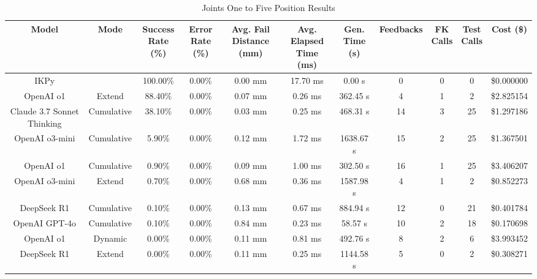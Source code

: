 \begin{table}[H]
\tiny
\renewcommand{\arraystretch}{1.2}
\caption{Joints One to Five Position Results}
\begin{center}
\begin{tabular}{|c|c|c|c|c|c|c|c|c|c|c|}
    \hline
    \textbf{Model} & 
    \textbf{Mode} & 
    \makecell{\textbf{Success}\\\textbf{Rate (\%)}} &
    \makecell{\textbf{Error}\\\textbf{Rate (\%)}} &
    \makecell{\textbf{Avg. Fail}\\\textbf{Distance (mm)}} &
    \makecell{\textbf{Avg. Elapsed}\\\textbf{Time (ms)}} &
    \makecell{\textbf{Gen.}\\\textbf{Time (s)}} &
    \textbf{Feedbacks} &
    \makecell{\textbf{FK}\\\textbf{Calls}} &
    \makecell{\textbf{Test}\\\textbf{Calls}} &
    \textbf{Cost (\$)} \\
    \hline
    IKPy &  & 100.00\% & 0.00\% & 0.00 mm & 17.70 ms & 0.00 s & 0 & 0 & 0 & \$0.000000 \\
    \hline
    OpenAI o1 & Extend & 88.40\% & 0.00\% & 0.07 mm & 0.26 ms & 362.45 s & 4 & 1 & 2 & \$2.825154 \\
    \hline
    Claude 3.7 Sonnet Thinking & Cumulative & 38.10\% & 0.00\% & 0.03 mm & 0.25 ms & 468.31 s & 14 & 3 & 25 & \$1.297186 \\
    \hline
    OpenAI o3-mini & Cumulative & 5.90\% & 0.00\% & 0.12 mm & 1.72 ms & 1638.67 s & 15 & 2 & 25 & \$1.367501 \\
    \hline
    OpenAI o1 & Cumulative & 0.90\% & 0.00\% & 0.09 mm & 1.00 ms & 302.50 s & 16 & 1 & 25 & \$3.406207 \\
    \hline
    OpenAI o3-mini & Extend & 0.70\% & 0.00\% & 0.68 mm & 0.36 ms & 1587.98 s & 4 & 1 & 2 & \$0.852273 \\
    \hline
    DeepSeek R1 & Cumulative & 0.10\% & 0.00\% & 0.13 mm & 0.67 ms & 884.94 s & 12 & 0 & 21 & \$0.401784 \\
    \hline
    OpenAI GPT-4o & Cumulative & 0.10\% & 0.00\% & 0.84 mm & 0.23 ms & 58.57 s & 10 & 2 & 18 & \$0.170698 \\
    \hline
    OpenAI o1 & Dynamic & 0.00\% & 0.00\% & 0.11 mm & 0.81 ms & 492.76 s & 8 & 2 & 6 & \$3.993452 \\
    \hline
    DeepSeek R1 & Extend & 0.00\% & 0.00\% & 0.11 mm & 0.25 ms & 1144.58 s & 5 & 0 & 2 & \$0.308271 \\

\end{tabular}
\end{center}
\end{table}
